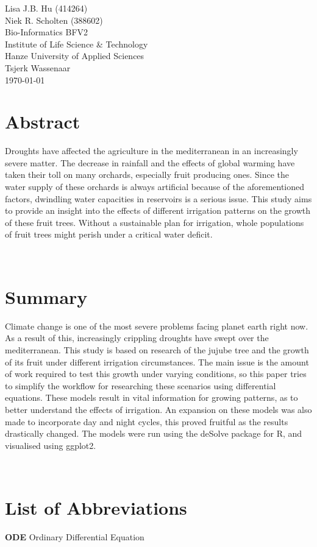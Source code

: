 \normalsize
\vspace*{\fill}
\begin{flushright}
Lisa J.B. Hu (414264)\\
Niek R. Scholten (388602)\\
Bio-Informatics BFV2\\
Institute of Life Science \& Technology\\
Hanze University of Applied Sciences\\
Tsjerk Wassenaar\\
\today
\end{flushright}
\newpage

\section*{Abstract}

Droughts have affected the agriculture in the mediterranean in an increasingly severe matter.
The decrease in rainfall and the effects of global warming have taken their toll on many orchards, especially fruit producing ones.
Since the water supply of these orchards is always artificial because of the aforementioned factors, dwindling water capacities in reservoirs is a serious issue.
This study aims to provide an insight into the effects of different irrigation patterns on the growth of these fruit trees.
Without a sustainable plan for irrigation, whole populations of fruit trees might perish under a critical water deficit.

\label{sec:abstract}~
\newpage

\section*{Summary}
Climate change is one of the most severe problems facing planet earth right now.
As a result of this, increasingly crippling droughts have swept over the mediterranean.
This study is based on research of the jujube tree and the growth of its fruit under different irrigation circumstances.
The main issue is the amount of work required to test this growth under varying conditions, so this paper tries to simplify the workflow for researching these scenarios using differential equations.
These models result in vital information for growing patterns, as to better understand the effects of irrigation.
An expansion on these models was also made to incorporate day and night cycles, this proved fruitful as the results drastically changed.
The models were run using the deSolve package for R, and visualised using ggplot2.

\label{sec:summ}~
\newpage

\section*{List of Abbreviations}

\textbf{ODE} Ordinary Differential Equation

\label{sec:abvs}~

\newpage